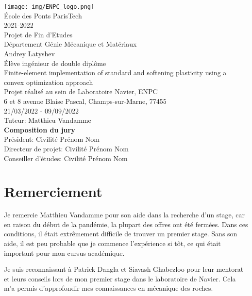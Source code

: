 \documentclass[12pt]{article}
\begin{document}
\begin{titlepage}
	{
        \center
	    \texttt{[image: img/ENPC\_logo.png]}\\[.44cm]
	    {\large École des Ponts ParisTech}\\[0.2cm]
	    {\normalsize 2021-2022}\\[.64cm]

	    {\Large Projet de Fin d'Etudes}\\[.5cm]
        {\large Département Génie Mécanique et Matériaux}\\[.85cm]
        {\Large Andrey Latyshev}\\[1cm]    
        {\large Élève ingénieur de double diplôme}\\[.85cm]

        {\Large Finite-element implementation of standard and softening plasticity using a convex optimization approach}\\[1cm]
        {\normalsize Projet réalisé au sein de Laboratoire Navier, ENPC}\\[0.2cm]
	    {\normalsize 6 et 8 avenue Blaise Pascal, Champs-sur-Marne, 77455}\\[0.2cm]
        {\normalsize 21/03/2022 - 09/09/2022}\\[1.1cm]

        {\large Tuteur: Matthieu Vandamme}\\[1.1cm]
    }
    \noindent \textbf{\normalsize Composition du jury}\\
    {\normalsize Président: Civilité Prénom Nom}\\
    {\normalsize Directeur de projet: Civilité Prénom Nom}\\
    {\normalsize Conseiller d'études: Civilité Prénom Nom}
\end{titlepage}

\section*{\centering Remerciement}
\setcounter{page}{2}

Je remercie Matthieu Vandamme pour son aide dans la recherche d'un stage, car en raison du début de la pandémie, la plupart des offres ont été fermées. Dans ces conditions, il était extrêmement difficile de trouver un premier stage. Sans son aide, il est peu probable que je commence l'expérience si tôt, ce qui était important pour mon cursus académique.

Je suis reconnaissant à Patrick Dangla et Siavash Ghabezloo pour leur mentorat et leurs conseils lors de mon premier stage dans le laboratoire de Navier. Cela m'a permis d'approfondir mes connaissances en mécanique des roches.
\end{document}
